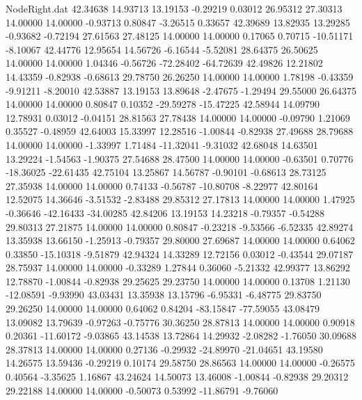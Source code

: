 \begin{filecontents}{NodeRight.dat}
  42.34638   14.93713   13.19153    -0.29219    0.03012   26.95312   27.30313   14.00000   14.00000   -0.93713    0.80847   -3.26515    0.33657
  42.39689   13.82935   13.29285    -0.93682   -0.72194   27.61563   27.48125   14.00000   14.00000    0.17065    0.70715  -10.51171   -8.10067
  42.44776   12.95654   14.56726    -6.16544   -5.52081   28.64375   26.50625   14.00000   14.00000    1.04346   -0.56726  -72.28402  -64.72639
  42.49826   12.21802   14.43359    -0.82938   -0.68613   29.78750   26.26250   14.00000   14.00000    1.78198   -0.43359   -9.91211   -8.20010
  42.53887   13.19153   13.89648    -2.47675   -1.29494   29.55000   26.64375   14.00000   14.00000    0.80847    0.10352  -29.59278  -15.47225
  42.58944   14.09790   12.78931     0.03012   -0.04151   28.81563   27.78438   14.00000   14.00000   -0.09790    1.21069    0.35527   -0.48959
  42.64003   15.33997   12.28516    -1.00844   -0.82938   27.49688   28.79688   14.00000   14.00000   -1.33997    1.71484  -11.32041   -9.31032
  42.68048   14.63501   13.29224    -1.54563   -1.90375   27.54688   28.47500   14.00000   14.00000   -0.63501    0.70776  -18.36025  -22.61435
  42.75104   13.25867   14.56787    -0.90101   -0.68613   28.73125   27.35938   14.00000   14.00000    0.74133   -0.56787  -10.80708   -8.22977
  42.80164   12.52075   14.36646    -3.51532   -2.83488   29.85312   27.17813   14.00000   14.00000    1.47925   -0.36646  -42.16433  -34.00285
  42.84206   13.19153   14.23218    -0.79357   -0.54288   29.80313   27.21875   14.00000   14.00000    0.80847   -0.23218   -9.53566   -6.52335
  42.89274   13.35938   13.66150    -1.25913   -0.79357   29.80000   27.69687   14.00000   14.00000    0.64062    0.33850  -15.10318   -9.51879
  42.94324   14.33289   12.72156     0.03012   -0.43544   29.07187   28.75937   14.00000   14.00000   -0.33289    1.27844    0.36060   -5.21332
  42.99377   13.86292   12.78870    -1.00844   -0.82938   29.25625   29.23750   14.00000   14.00000    0.13708    1.21130  -12.08591   -9.93990
  43.03431   13.35938   13.15796    -6.95331   -6.48775   29.83750   29.26250   14.00000   14.00000    0.64062    0.84204  -83.15847  -77.59055
  43.08479   13.09082   13.79639    -0.97263   -0.75776   30.36250   28.87813   14.00000   14.00000    0.90918    0.20361  -11.60172   -9.03865
  43.14538   13.72864   14.29932    -2.08282   -1.76050   30.09688   28.37813   14.00000   14.00000    0.27136   -0.29932  -24.89970  -21.04651
  43.19580   14.26575   13.59436    -0.29219    0.10174   29.58750   28.86563   14.00000   14.00000   -0.26575    0.40564   -3.35625    1.16867
  43.24624   14.50073   13.46008    -1.00844   -0.82938   29.20312   29.22188   14.00000   14.00000   -0.50073    0.53992  -11.86791   -9.76060

\end{filecontents}
